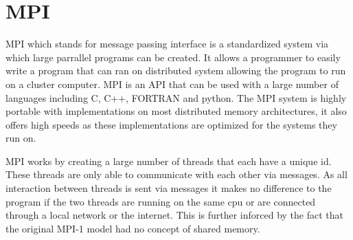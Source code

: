 \section{MPI}

MPI which stands for message passing interface is a standardized system via which large parrallel programs can be created. It allows a programmer to easily write a program that can ran on distributed system allowing the program to run on a cluster computer. MPI is an API that can be used with a large number of languages including C, C++, FORTRAN and python. The MPI system is highly portable with implementations on most distributed memory architectures, it also offers high speeds as these implementations are optimized for the systems they run on.

MPI works by creating a large number of threads that each have a unique id. These threads are only able to communicate with each other via messages. As all interaction between threads is sent via messages it makes no difference to the program if the two threads are running on the same cpu or are connected through a local network or the internet. This is further inforced by the fact that the original MPI-1 model had no concept of shared memory.